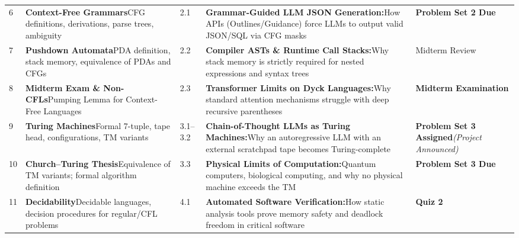 \documentclass[11pt,a4paper]{article}
\begin{document}
{\begin{longtable}{@{} C{0.6cm} L{3.5cm} C{1.3cm} L{5.2cm} L{3.6cm} @{}}
    6 & \textbf{Context-Free Grammars}\newline CFG definitions, derivations, parse trees, ambiguity & 2.1 & \textbf{Grammar-Guided LLM JSON Generation:}\newline How APIs (Outlines/Guidance) force LLMs to output valid JSON/SQL via CFG masks & \textbf{Problem Set 2 Due} \\

    7 & \textbf{Pushdown Automata}\newline PDA definition, stack memory, equivalence of PDAs and CFGs & 2.2 & \textbf{Compiler ASTs \& Runtime Call Stacks:}\newline Why stack memory is strictly required for nested expressions and syntax trees & Midterm Review \\

    8 & \textbf{Midterm Exam \& Non-CFLs}\newline Pumping Lemma for Context-Free Languages & 2.3 & \textbf{Transformer Limits on Dyck Languages:}\newline Why standard attention mechanisms struggle with deep recursive parentheses & \textbf{Midterm Examination} \\

    9 & \textbf{Turing Machines}\newline Formal 7-tuple, tape head, configurations, TM variants & 3.1--3.2 & \textbf{Chain-of-Thought LLMs as Turing Machines:}\newline Why an autoregressive LLM with an external scratchpad tape becomes Turing-complete & \textbf{Problem Set 3 Assigned}\newline \textit{(Project Announced)} \\

    10 & \textbf{Church--Turing Thesis}\newline Equivalence of TM variants; formal algorithm definition & 3.3 & \textbf{Physical Limits of Computation:}\newline Quantum computers, biological computing, and why no physical machine exceeds the TM & \textbf{Problem Set 3 Due} \\

    11 & \textbf{Decidability}\newline Decidable languages, decision procedures for regular/CFL problems & 4.1 & \textbf{Automated Software Verification:}\newline How static analysis tools prove memory safety and deadlock freedom in critical software & \textbf{Quiz 2} \\


\end{longtable}}
\end{document}
